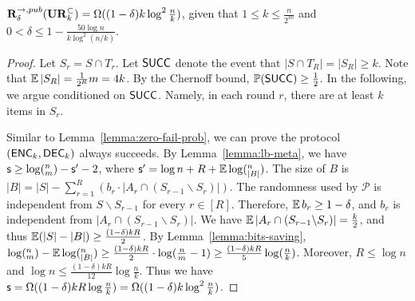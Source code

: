 \begin{theorem}\label{thm:urk}
  $\mathbf{R}^{\rightarrow,pub}_\delta(\mathbf{UR}_k^\subset) = \Omega((1-\delta)k\log^2 \frac{n}{k} )$, given that $1 \le k \le \frac{n}{2^{10}}$ and $0<\delta \le 1-\frac{50\log n}{k\log^2(n/k)}$.
\end{theorem}
\begin{proof}
Let $S_r=S\cap T_r$.  Let $\textsf{SUCC}$ denote the event that $|S\cap T_R|=|S_R|\ge k$.  Note that $\operatorname*{\mathbb{E}}|S_R|=\frac{1}{2^R}m=4k$. By the Chernoff bound, $\operatorname*{\mathbb{P}}(\textsf{SUCC})\ge \frac{1}{2}$.  In the following, we argue conditioned on $\textsf{SUCC}$. Namely, in each round $r$, there are at least $k$ items in $S_r$.
  
Similar to Lemma~\ref{lemma:zero-fail-prob}, we can prove the protocol $(\textsf{ENC}_k,\textsf{DEC}_k)$ always succeeds.  By Lemma~\ref{lemma:lb-meta}, we have $\textsf{s}\ge \log (^n_m) - \textsf{s}' -2$, where $\textsf{s}'=\log n + R+ \operatorname*{\mathbb{E}} \log (^n_{|B|})$.  The size of $B$ is $|B|=|S|-\sum_{r=1}^{R}{(b_r \cdot |A_r \cap (S_{r-1}\backslash S_r)|)}$.  The randomness used by $\mathcal{P}$ is independent from $S\backslash S_{r-1}$ for every $r\in[R]$.  Therefore, $\operatorname*{\mathbb{E}} b_r\ge 1-\delta$, and $b_r$ is independent from $|A_r \cap (S_{r-1}\backslash S_r)|$.  We have $\operatorname*{\mathbb{E}}|A_r \cap (S_{r-1}\backslash S_r)|=\frac{k}{2}$, and thus $\operatorname*{\mathbb{E}}(|S|-|B|)\ge \frac{(1-\delta)kR}{2}$.  By Lemma~\ref{lemma:bits-saving}, $\log (^n_m)-\operatorname*{\mathbb{E}}\log (^n_{|B|})\ge \frac{(1-\delta)kR}{2}\cdot \log (\frac{n}{m}-1) \ge \frac{(1-\delta)kR}{5}\log (\frac{n}{k})$.  Moreover, $R\le \log n$ and $\log n \le \frac{(1-\delta)kR}{12}\log \frac{n}{k}$.  Thus we have $\textsf{s} = \Omega((1-\delta)kR\log\frac{n}{k}) = \Omega((1-\delta)k\log^2 \frac{n}{k} )$.
\end{proof}
